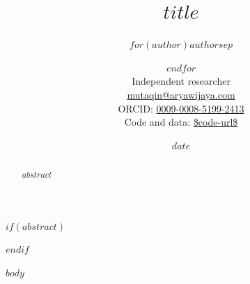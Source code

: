 \documentclass[11pt,letterpaper]{article}
\title{$title$}
\author{$for(author)$$author$$sep$ \and $endfor$\\[2pt] \normalsize Independent researcher\\[1pt] \small \href{mailto:mutaqin@aryawijaya.com}{mutaqin@aryawijaya.com}\\[1pt] \small ORCID: \href{https://orcid.org/0009-0008-5199-2413}{0009-0008-5199-2413}\\[2pt] \small Code and data: \url{$code-url$}}
\date{$date$}
\begin{document}
\maketitle
$if(abstract)$
\begin{abstract}
\noindent $abstract$
\end{abstract}
$endif$

$body$
\end{document}
